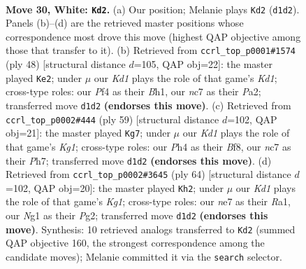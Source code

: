 \documentclass[11pt]{article}
\begin{document}
\clearpage

\begin{figure}[p]\centering
\begin{subfigure}{0.46\textwidth}\centering
\resizebox{\linewidth}{!}{%
\newchessgame
\chessboard[
  setfen={3r1b2/2nkn1pr/6b1/7p/p1B1pP1P/P5R1/1P4P1/R2K2NN w - - 20 30},
  showmover=false,
  pgfstyle=straightmove, color=movearrow, markmove={d1-d2}
]}
\caption{}
\end{subfigure}\hfill
\begin{subfigure}{0.46\textwidth}\centering
\resizebox{\linewidth}{!}{%
\newchessgame
\chessboard[
  setfen={1n3r2/rb2kp2/pb2p2p/1p2P3/4NP2/1N6/PPR4P/3K1R1B w - - 5 25},
  showmover=false,
  pgfstyle=straightmove, color=movearrow, markmove={d1-e2}
]}
\caption{}
\end{subfigure}
\\[4pt]
\begin{subfigure}{0.46\textwidth}\centering
\resizebox{\linewidth}{!}{%
\newchessgame
\chessboard[
  setfen={5bk1/7p/pNN1rpp1/1n6/1P2pP2/4B1Pb/4PK1P/2R5 b - - 2 30},
  showmover=false,
  pgfstyle=straightmove, color=movearrow, markmove={g8-g7}
]}
\caption{}
\end{subfigure}\hfill
\begin{subfigure}{0.46\textwidth}\centering
\resizebox{\linewidth}{!}{%
\newchessgame
\chessboard[
  setfen={2r3k1/5p2/p3b1pB/P1nr3p/B1p4P/2P2P2/2P3P1/R3R1K1 w - - 3 33},
  showmover=false,
  pgfstyle=straightmove, color=movearrow, markmove={g1-h2}
]}
\caption{}
\end{subfigure}
\caption{\textbf{Move 30, White: \texttt{Kd2}.} (a) Our position; Melanie plays \texttt{Kd2} (\texttt{d1d2}). Panels (b)--(d) are the retrieved master positions whose correspondence most drove this move (highest QAP objective among those that transfer to it). (b) Retrieved from \texttt{ccrl\_top\_p0001\#1574} (ply 48) [structural distance $d$=105, QAP obj=22]: the master played \texttt{Ke2}; under $\mu$ our \emph{Kd1} plays the role of that game's \emph{Kd1}; cross-type roles: our \emph{P}f4 as their \emph{B}h1, our \emph{n}c7 as their \emph{P}a2; transferred move \texttt{d1d2} \textbf{(endorses this move)}. (c) Retrieved from \texttt{ccrl\_top\_p0002\#444} (ply 59) [structural distance $d$=102, QAP obj=21]: the master played \texttt{Kg7}; under $\mu$ our \emph{Kd1} plays the role of that game's \emph{Kg1}; cross-type roles: our \emph{P}h4 as their \emph{B}f8, our \emph{n}c7 as their \emph{P}h7; transferred move \texttt{d1d2} \textbf{(endorses this move)}. (d) Retrieved from \texttt{ccrl\_top\_p0002\#3645} (ply 64) [structural distance $d$=102, QAP obj=20]: the master played \texttt{Kh2}; under $\mu$ our \emph{Kd1} plays the role of that game's \emph{Kg1}; cross-type roles: our \emph{n}e7 as their \emph{R}a1, our \emph{N}g1 as their \emph{P}g2; transferred move \texttt{d1d2} \textbf{(endorses this move)}. Synthesis: 10 retrieved analogs transferred to \texttt{Kd2} (summed QAP objective 160, the strongest correspondence among the candidate moves); Melanie committed it via the \texttt{search} selector.}
\label{fig:thought-m58}
\end{figure}
\end{document}
